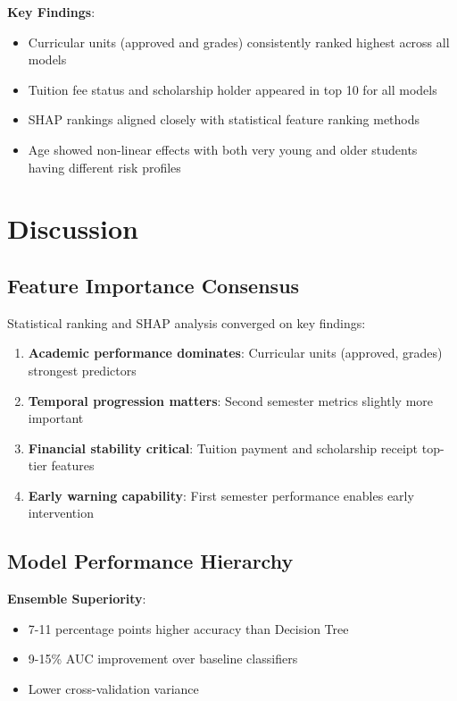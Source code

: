 \textbf{Key Findings}:
\begin{itemize}
    \item Curricular units (approved and grades) consistently ranked highest across all models
    \item Tuition fee status and scholarship holder appeared in top 10 for all models
    \item SHAP rankings aligned closely with statistical feature ranking methods
    \item Age showed non-linear effects with both very young and older students having different risk profiles
\end{itemize}

\section{Discussion}
\label{sec:discussion}

\subsection{Feature Importance Consensus}

Statistical ranking and SHAP analysis converged on key findings:
\begin{enumerate}
    \item \textbf{Academic performance dominates}: Curricular units (approved, grades) strongest predictors
    \item \textbf{Temporal progression matters}: Second semester metrics slightly more important
    \item \textbf{Financial stability critical}: Tuition payment and scholarship receipt top-tier features
    \item \textbf{Early warning capability}: First semester performance enables early intervention
\end{enumerate}

\subsection{Model Performance Hierarchy}

\textbf{Ensemble Superiority}:
\begin{itemize}
    \item 7-11 percentage points higher accuracy than Decision Tree
    \item 9-15\% AUC improvement over baseline classifiers
    \item Lower cross-validation variance
\end{itemize}

